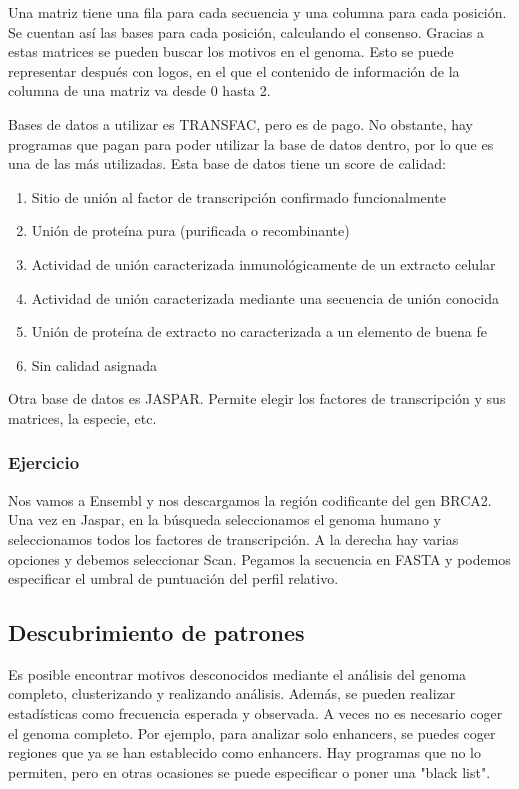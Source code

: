 Una matriz tiene una fila para cada secuencia y una columna para cada posición. Se cuentan así las bases para cada posición, calculando el consenso. Gracias a estas matrices se pueden buscar los motivos en el genoma. Esto se puede representar después con logos, en el que el contenido de información de la columna de una matriz va desde 0 hasta 2. 

Bases de datos a utilizar es TRANSFAC, pero es de pago. No obstante, hay programas que pagan para poder utilizar la base de datos dentro, por lo que es una de las más utilizadas. Esta base de datos tiene un score de calidad:
\begin{enumerate}
\item Sitio de unión al factor de transcripción confirmado funcionalmente
\item Unión de proteína pura (purificada o recombinante)
\item Actividad de unión caracterizada inmunológicamente de un extracto celular
\item Actividad de unión caracterizada mediante una secuencia de unión conocida
\item Unión de proteína de extracto no caracterizada a un elemento de buena fe
\item Sin calidad asignada
\end{enumerate}

Otra base de datos es JASPAR. Permite elegir los factores de transcripción y sus matrices, la especie, etc. 

\subsubsection{Ejercicio}
Nos vamos a Ensembl y nos descargamos la región codificante del gen BRCA2. Una vez en Jaspar, en la búsqueda seleccionamos el genoma humano y seleccionamos todos los factores de transcripción. A la derecha hay varias opciones y debemos seleccionar Scan. Pegamos la secuencia en FASTA y podemos especificar el umbral de puntuación del perfil relativo. 

\subsection{Descubrimiento de patrones}
Es posible encontrar motivos desconocidos mediante el análisis del genoma completo, clusterizando y realizando análisis. Además, se pueden realizar estadísticas como frecuencia esperada y observada. A veces no es necesario coger el genoma completo. Por ejemplo, para analizar solo enhancers, se puedes coger regiones que ya se han establecido como enhancers. Hay programas que no lo permiten, pero en otras ocasiones se puede especificar o poner una "black list". 

